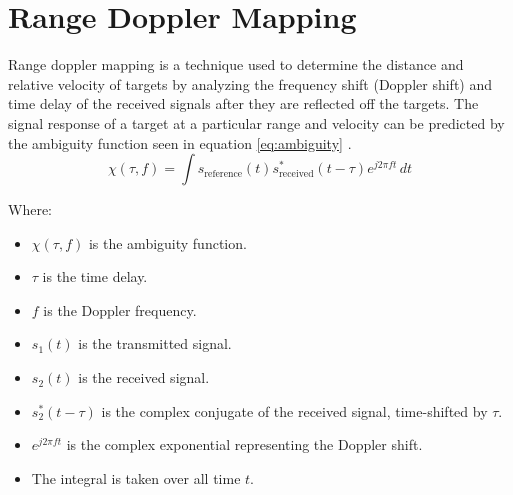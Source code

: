
\section{Range Doppler Mapping \label{sec:rangeDoppler}}
Range doppler mapping is a technique used to determine the distance and relative velocity of targets by analyzing the frequency shift (Doppler shift) and time delay of the received signals after they are reflected off the targets. The signal response of a target at a particular range and velocity can be predicted by the ambiguity function seen in equation \ref*{eq:ambiguity} \cite{INTRO2017}. 
\begin{equation}
    \chi(\tau, f) = \int s_{\text{reference}}(t) s_{\text{received}}^*(t - \tau) e^{j2\pi f t} \, dt \label{eq:ambiguity}
\end{equation}

Where:
\begin{multicols}{2}
\begin{itemize}
\item \( \chi(\tau, f) \) is the ambiguity function.
\item \( \tau \) is the time delay.
\item \( f \) is the Doppler frequency.
\item \( s_1(t) \) is the transmitted signal.
\item \( s_2(t) \) is the received signal.
\item \( s_2^*(t - \tau) \) is the complex conjugate of the received signal, time-shifted by \( \tau \).
\item \( e^{j2\pi f t} \) is the complex exponential representing the Doppler shift.
\item The integral is taken over all time \( t \).
\end{itemize}
\end{multicols}

